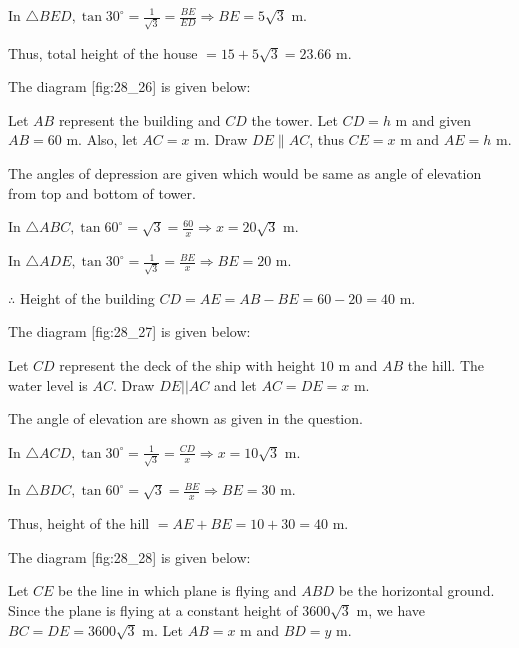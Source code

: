   In $\triangle BED, \tan30^\circ = \frac{1}{\sqrt{3}} = \frac{BE}{ED} \Rightarrow BE = 5\sqrt{3}$ m.

  Thus, total height of the house $= 15 + 5\sqrt{3} = 23.66$ m.

\item The diagram [fig:28_26] is given below:

  \startplacefigure[reference=fig:28_26]
    \externalfigure[28_26.pdf]
  \stopplacefigure

  Let $AB$ represent the building and $CD$ the tower. Let $CD = h$ m and given $AB = 60$ m. Also, let
  $AC = x$ m. Draw $DE\parallel AC$, thus $CE = x$ m and $AE = h$ m.

  The angles of depression are given which would be same as angle of elevation from top and bottom of tower.

  In $\triangle ABC, \tan60^\circ = \sqrt{3} = \frac{60}{x} \Rightarrow x = 20\sqrt{3}$ m.

  In $\triangle ADE, \tan30^\circ = \frac{1}{\sqrt{3}} = \frac{BE}{x}\Rightarrow BE = 20$ m.

  $\therefore$ Height of the building $CD = AE = AB - BE = 60 - 20 = 40$ m.

\item The diagram [fig:28_27] is given below:

  \startplacefigure[reference=fig:28_27]
    \externalfigure[28_27.pdf]
  \stopplacefigure

  Let $CD$ represent the deck of the ship with height $10$ m and $AB$ the hill. The water level is
  $AC$. Draw $DE||AC$ and let $AC = DE = x$ m.

  The angle of elevation are shown as given in the question.

  In $\triangle ACD, \tan30^\circ = \frac{1}{\sqrt{3}} = \frac{CD}{x} \Rightarrow x = 10\sqrt{3}$ m.

  In $\triangle BDC, \tan60^\circ = \sqrt{3} = \frac{BE}{x} \Rightarrow BE = 30$ m.

  Thus, height of the hill $= AE + BE = 10 + 30 = 40$ m.

\item The diagram [fig:28_28] is given below:

  \startplacefigure[reference=fig:28_28]
    \externalfigure[28_28.pdf]
  \stopplacefigure

  Let $CE$ be the line in which plane is flying and $ABD$ be the horizontal ground. Since the plane is flying at a
  constant height of $3600\sqrt{3}$ m, we have $BC = DE = 3600\sqrt{3}$ m. Let $AB = x$ m and $BD = y$ m.

